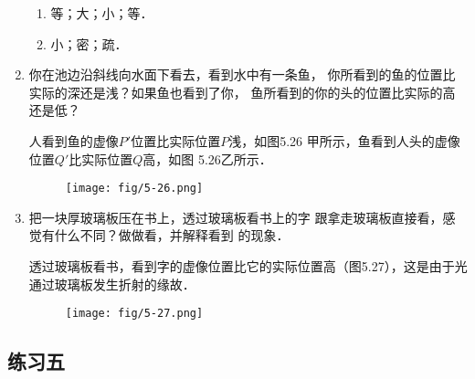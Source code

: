 \begin{enumerate}
    \begin{solution}
\begin{enumerate}
    \item 等；大；小；等．
    \item 小；密；疏．
\end{enumerate}
    \end{solution}
    \item 你在池边沿斜线向水面下看去，看到水中有一条鱼，
    你所看到的鱼的位置比实际的深还是浅？如果鱼也看到了你，
    鱼所看到的你的头的位置比实际的高还是低？

    \begin{solution}
人看到鱼的虚像$P'$位置比实际位置$P$浅，如图5.26
甲所示，鱼看到人头的虚像位置$Q'$比实际位置$Q$高，如图
5.26乙所示．
\begin{figure}[htp]
    \centering
    \texttt{[image: fig/5-26.png]}
    \caption{}
\end{figure}
    \end{solution}
    \item 把一块厚玻璃板压在书上，透过玻璃板看书上的字
    跟拿走玻璃板直接看，感觉有什么不同？做做看，并解释看到
    的现象．

    \begin{solution}
透过玻璃板看书，看到字的虚像位置比它的实际位置高（图5.27），这是由于光通过玻璃板发生折射的缘故．
\begin{figure}[htp]
    \centering
    \texttt{[image: fig/5-27.png]}
    \caption{}
\end{figure}
    \end{solution}
\end{enumerate}



\subsection{练习五}

